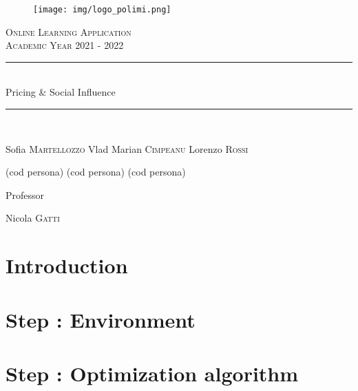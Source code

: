 \documentclass{article}
\begin{document}
\begin{titlepage}
      \centering
      \begin{figure}
            \begin{center}
                  \texttt{[image: img/logo\_polimi.png]}
            \end{center}
      \end{figure}
      \vfill
      {\scshape\LARGE Online Learning Application\\Academic Year 2021 - 2022 \par}
      
      
      \vfill
      \newcommand{\HRule}{\rule{\linewidth}{0.3mm}}
      \centering
      \HRule \\[0.4cm]
      \huge  Pricing \& Social Influence\\%
      \HRule \\
      \vspace{1cm}
      {\Large Sofia \textsc{Martellozzo} \quad  Vlad Marian \textsc{Cimpeanu}  \quad  Lorenzo \textsc{Rossi}\par}
      {\Large(cod persona) \quad (cod persona) \quad (cod persona) \par}
      \vfill
      {\large Professor\par
          Nicola \textsc{Gatti}}
\end{titlepage}


\newpage
\renewcommand\contentsname{Contents}
\tableofcontents

\newpage

\section*{Introduction}



\newpage
\section{Step : Environment}



\newpage
\section{Step : Optimization algorithm}



\newpage
\end{document}
